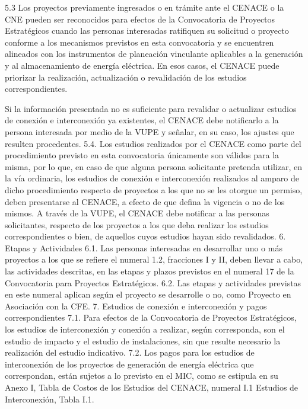 5.3 Los proyectos previamente ingresados o en trámite ante el CENACE o la CNE pueden ser reconocidos para efectos de la Convocatoria de Proyectos Estratégicos cuando las personas interesadas ratifiquen su solicitud o proyecto conforme a los mecanismos previstos en esta convocatoria y se encuentren alineados con los instrumentos de planeación vinculante aplicables a la generación y al almacenamiento de energía eléctrica. En esos casos, el CENACE puede priorizar la realización, actualización o revalidación de los estudios correspondientes.\par
Si la información presentada no es suficiente para revalidar o actualizar estudios de conexión e interconexión ya existentes, el CENACE debe notificarlo a la persona interesada por medio de la VUPE y señalar, en su caso, los ajustes que resulten procedentes.
5.4. Los estudios realizados por el CENACE como parte del procedimiento previsto en esta convocatoria únicamente son válidos para la misma, por lo que, en caso de que alguna persona solicitante pretenda utilizar, en la vía ordinaria, los estudios de conexión e interconexión realizados al amparo de dicho procedimiento respecto de proyectos a los que no se les otorgue un permiso, deben presentarse al CENACE, a efecto de que defina la vigencia o no de los mismos.
A través de la VUPE, el CENACE debe notificar a las personas solicitantes, respecto de los proyectos a los que deba realizar los estudios correspondientes o bien, de aquellos cuyos estudios hayan sido revalidados.
6. Etapas y Actividades
6.1. Las personas interesadas en desarrollar uno o más proyectos a los que se refiere el numeral 1.2, fracciones I y II, deben llevar a cabo, las actividades descritas, en las etapas y plazos previstos en el numeral 17 de la Convocatoria para Proyectos Estratégicos.
6.2. Las etapas y actividades previstas en este numeral aplican según el proyecto se desarrolle o no, como Proyecto en Asociación con la CFE.
7. Estudios de conexión e interconexión y pagos correspondientes
7.1. Para efectos de la Convocatoria de Proyectos Estratégicos, los estudios de interconexión y conexión a realizar, según corresponda, son el estudio de impacto y el estudio de instalaciones, sin que resulte necesario la realización del estudio indicativo.
7.2. Los pagos para los estudios de interconexión de los proyectos de generación de energía eléctrica que correspondan, están sujetos a lo previsto en el MIC, como se estipula en su Anexo I, Tabla de Costos de los Estudios del CENACE, numeral I.1 Estudios de Interconexión, Tabla I.1.

